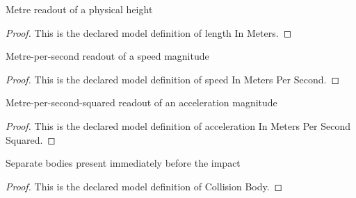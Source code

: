 \begin{definition}
  \label{def:physics:phyx-mini-0815:phyxminiproblems-problemphyxmini0815-lengthinmeters}
  Metre readout of a physical height
\end{definition}
\begin{proof}
  This is the declared model definition of length In Meters.
\end{proof}
\begin{definition}
  \label{def:physics:phyx-mini-0815:phyxminiproblems-problemphyxmini0815-speedinmeterspersecond}
  Metre-per-second readout of a speed magnitude
\end{definition}
\begin{proof}
  This is the declared model definition of speed In Meters Per Second.
\end{proof}
\begin{definition}
  \label{def:physics:phyx-mini-0815:phyxminiproblems-problemphyxmini0815-accelerationinmeterspersecondsquared}
  Metre-per-second-squared readout of an acceleration magnitude
\end{definition}
\begin{proof}
  This is the declared model definition of acceleration In Meters Per Second Squared.
\end{proof}
\begin{definition}
  \label{def:physics:phyx-mini-0815:phyxminiproblems-problemphyxmini0815-collisionbody}
  Separate bodies present immediately before the impact
\end{definition}
\begin{proof}
  This is the declared model definition of Collision Body.
\end{proof}
